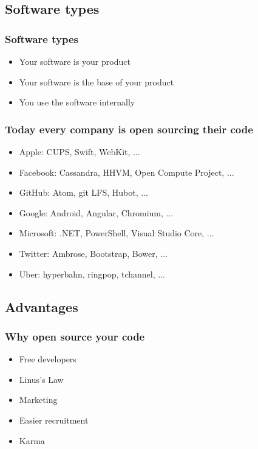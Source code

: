 \documentclass[t,aspectratio=169]{beamer}
\begin{document}
\subsection{Software types}
\begin{frame}
    \frametitle{Software types}
    \begin{itemize}
        \item<2-> Your software is your product
        \item<3-> Your software is the base of your product
        \item<4-> You use the software internally
    \end{itemize}
\end{frame}

\begin{frame}
    \frametitle{Today every company is open sourcing their code}
    \begin{itemize}
        \item<2-> Apple: CUPS, Swift, WebKit, ...
        \item<3-> Facebook: Cassandra, HHVM, Open Compute Project, ...
        \item<4-> GitHub: Atom, git LFS, Hubot, ...
        \item<5-> Google: Android, Angular, Chromium, ...
        \item<6-> Microsoft: .NET, PowerShell, Visual Studio Core, ...
        \item<7-> Twitter: Ambrose, Bootstrap, Bower, ...
        \item<8-> Uber: hyperbahn, ringpop, tchannel, ...
    \end{itemize}
\end{frame}

\subsection{Advantages}
\begin{frame}
    \frametitle{Why open source your code}
    \begin{itemize}
        \item<2-> Free developers
        \item<3-> Linus's Law
        \item<4-> Marketing
        \item<5-> Easier recruitment
        \item<6-> Karma
    \end{itemize}
\end{frame}
\end{document}
